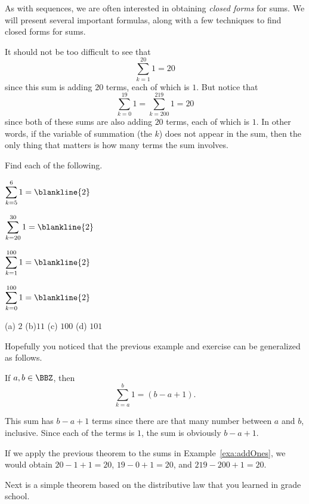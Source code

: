 As with sequences, we are often interested in obtaining {\em closed forms} for sums.
We will present several important formulas, along with a few techniques to find 
closed forms for sums.

\begin{exa}\label{exa:addOnes}
It should not be too difficult to see that 
$$\sum_{k=1}^{20} 1 = 20$$
since this sum is adding $20$ terms, each of which is $1$.
But notice that 
$$\sum_{k=0}^{19} 1 = \sum_{k=200}^{219} 1 = 20$$
since both of these sums are also adding $20$ terms, each of which is $1$.
In other words, if the variable of summation (the $k$) does not appear in the
sum, then the only thing that matters is how many terms the sum involves.
\end{exa}

\begin{exer}
Find each of the following.
\begin{lenum}
\item ${\displaystyle \sum_{k=5}^{6} 1 = \blankline{2} }$
\item ${\displaystyle \sum_{k=20}^{30} 1 = \blankline{2} }$
\item ${\displaystyle \sum_{k=1}^{100} 1 = \blankline{2} }$
\item ${\displaystyle \sum_{k=0}^{100} 1 = \blankline{2} }$
\end{lenum}
\begin{answer}
(a) $2$
(b)$11$
(c) $100$
(d) $101$
\end{answer}
\end{exer}

Hopefully you noticed that the previous example and exercise can be generalized as follows.

\begin{thm}\label{thm:sumones}
If $a,b\in\BBZ$, then 
$$\sum_{k=a}^b 1 = (b-a+1).$$
\begin{pf}
This sum has $b-a+1$ terms since there are that many number between $a$ and $b$, inclusive.
Since each of the terms is $1$, the sum is obviously $b-a+1$.
\end{pf}
\end{thm}

\begin{exa}
If we apply the previous theorem to the sums in Example~\ref{exa:addOnes},
we would obtain $20-1+1=20$, $19-0+1=20$, and $219-200+1=20$.
\end{exa}

Next is a simple theorem based on the distributive law that you learned in
grade school. 

